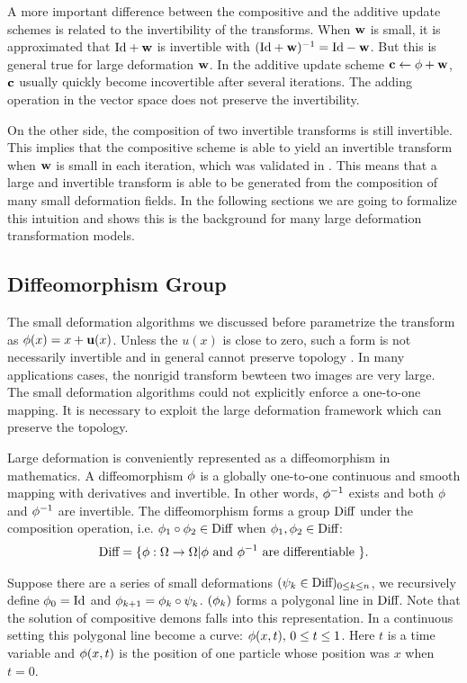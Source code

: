 \documentclass[letterpaper,12pt]{article}
\begin{document}
A more important difference between the compositive and the additive update schemes is related to the invertibility of the transforms. 
When $\mathbf{w}$ is small, it is approximated that $\text{Id}+\mathbf{w}$ is invertible with $(\text{Id}+\mathbf{w})^{-1}=\text{Id}-\mathbf{w}$. But this is general true for large deformation $\mathbf{w}$. 
In the additive update scheme $\mathbf{c} \leftarrow \phi + \mathbf{w}$, $\mathbf{c}$ usually quickly become incovertible after several iterations. 
The adding operation in the vector space does not preserve the invertibility. 

On the other side, the composition of two invertible transforms is still invertible. 
This implies that the compositive scheme is able to yield an invertible transform when $\mathbf{w}$ is small in each iteration, which was validated in \cite{Vercauteren2009}. 
This means that a large and invertible transform is able to be generated from the composition of many small deformation fields. 
In the following sections we are going to formalize this intuition and shows this is the background for many large deformation transformation models.

\subsection{Diffeomorphism Group}
\label{sec:diffgroup}

The small deformation algorithms we discussed before parametrize the transform as $\phi(x) = x + \mathbf{u}(x)$. Unless the $u(x)$ is close to zero, such a form is not necessarily invertible and in general cannot preserve topology . In many applications cases, the nonrigid transform bewteen two images are very large. The small deformation algorithms could not explicitly enforce a one-to-one mapping. It is necessary to exploit the large deformation framework which can preserve the topology.

Large deformation is conveniently represented as a diffeomorphism in mathematics. A diffeomorphism $\phi$ is a globally one-to-one continuous and smooth mapping with derivatives and invertible. In other words, $\phi^{-1}$ exists and both $\phi$ and $\phi^{-1}$ are invertible. The diffeomorphism forms a group $\text{Diff}$ under the composition operation, i.e. $\phi_1 \circ \phi_2 \in \text{Diff}$ when $\phi_1, \phi_2 \in \text{Diff}$:
\begin{align}
\text{Diff} = \{ \phi: \Omega \to \Omega | \phi \text{ and } \phi^{-1} \text{ are differentiable }\}.
\end{align}

Suppose there are a series of small deformations $(\psi_k \in \text{Diff})_{0 \leq k \leq n}$, we recursively define $\phi_0 = \text{Id}$ and $\phi_{k+1} = \phi_{k} \circ \psi_{k}$.  $(\phi_{k})$ forms a polygonal line in $\text{Diff}$. Note that the solution of compositive demons falls into this representation. In a continuous setting this polygonal line become a curve: $\phi(x, t), \, 0 \leq t \leq 1$. Here $t$ is a time variable and $\phi(x, t)$ is the position of one particle whose position was $x$ when $t=0$.
\end{document}
